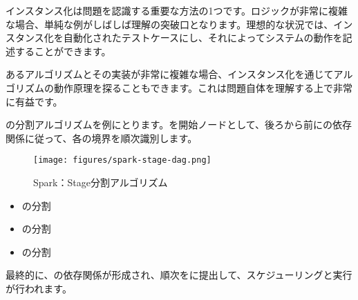 \begin{content}

インスタンス化は問題を認識する重要な方法の1つです。ロジックが非常に複雑な場合、単純な例がしばしば理解の突破口となります。理想的な状況では、インスタンス化を自動化されたテストケースにし、それによってシステムの動作を記述することができます。

あるアルゴリズムとその実装が非常に複雑な場合、インスタンス化を通じてアルゴリズムの動作原理を探ることもできます。これは問題自体を理解する上で非常に有益です。

の分割アルゴリズムを例にとります。を開始ノードとして、後ろから前にの依存関係に従って、各の境界を順次識別します。

\begin{figure}[!htbp]
\centering
\texttt{[image: figures/spark-stage-dag.png]}
\caption{Spark：Stage分割アルゴリズム}
 \label{fig:spark-stage-dag}
\end{figure}

\begin{itemize}
 \item {}の分割
   \begin{enum}
   \end{enum}

 \item {}の分割
   \begin{enum}
   \end{enum}
 \item {}の分割
   \begin{enum}
   \end{enum} 
\end{itemize}

最終的に、の依存関係が形成され、順次をに提出して、スケジューリングと実行が行われます。

\end{content}


